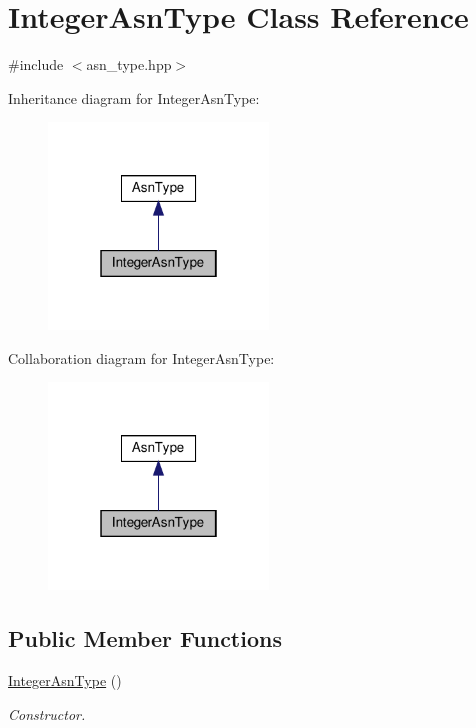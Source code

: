 \hypertarget{classIntegerAsnType}{}\section{Integer\+Asn\+Type Class Reference}
\label{classIntegerAsnType}


{\ttfamily \#include $<$asn\+\_\+type.\+hpp$>$}



Inheritance diagram for Integer\+Asn\+Type\+:
\nopagebreak
\begin{figure}[H]
\begin{center}
\leavevmode
\includegraphics[width=166pt]{dc/de9/classIntegerAsnType__inherit__graph}
\end{center}
\end{figure}


Collaboration diagram for Integer\+Asn\+Type\+:
\nopagebreak
\begin{figure}[H]
\begin{center}
\leavevmode
\includegraphics[width=166pt]{de/d54/classIntegerAsnType__coll__graph}
\end{center}
\end{figure}
\subsection*{Public Member Functions}
\begin{DoxyCompactItemize}
\item 
\hyperlink{classIntegerAsnType_a111aa2d1bb89ac97efa82191ba4a699d}{Integer\+Asn\+Type} ()
\begin{DoxyCompactList}\small\item\em Constructor. \end{DoxyCompactList}\end{DoxyCompactItemize}
